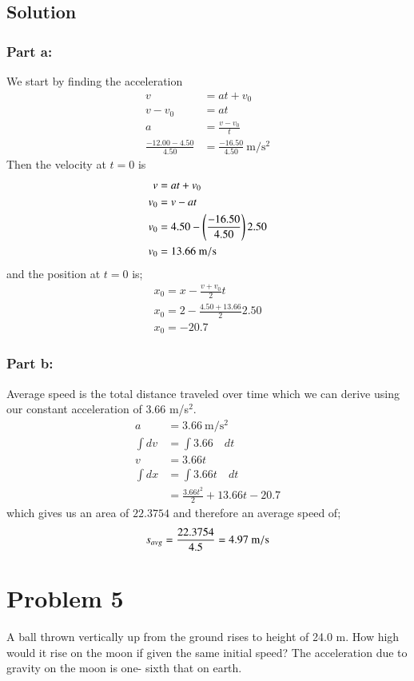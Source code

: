 \documentclass{article}
\begin{document}
\subsection*{Solution}
\subsubsection*{Part a:}
We start by finding the acceleration
\begin{align*}
	v &= at + v_0 \\
	v - v_0 &= at \\
	a &= \frac{v - v_0}{t} \\
	\frac{-12.00 - 4.50}{4.50} &= \frac{-16.50}{4.50}\ \unit{\meter\per\second^2}
\end{align*}
Then the velocity at $t=0$ is
\begin{align*}
	v &= at + v_0 \\
	v_0 &= v - at \\
	v_0 &= 4.50 - \left(\frac{-16.50}{4.50}\right) 2.50 \\
	v_0 &= 13.66\ \unit{{\meter\per\second}}
\end{align*}
and the position at $t=0$ is;
\begin{align*}
	x_0 = x - \frac{v + v_0}{2} t \\
	x_0 = 2 - \frac{4.50 + 13.66}{2} 2.50 \\
	x_0 = -20.7
\end{align*}

\subsubsection*{Part b:}
Average speed is the total distance traveled over time which we can derive using our constant acceleration of $3.66$ m/s$^2$.
\begin{align*}
	a &= 3.66\ \unit{\meter\per\second^2} \\
	\int dv &= \int 3.66 \quad dt \\
	v &= 3.66t \\
	\int dx &= \int 3.66t \quad dt \\
		&= \frac{3.66t^2}{2} + 13.66t - 20.7
\end{align*}
which gives us an area of $22.3754$ and therefore an average speed of;
\[
	s_{avg} = \frac{22.3754}{4.5} = 4.97\ \unit{{\meter\per\second}}
\]

\section*{Problem 5}
A ball thrown vertically up from the ground rises to height of 24.0 m. How high would it rise
on the moon if given the same initial speed? The acceleration due to gravity on the moon is one-
sixth that on earth.
\end{document}
